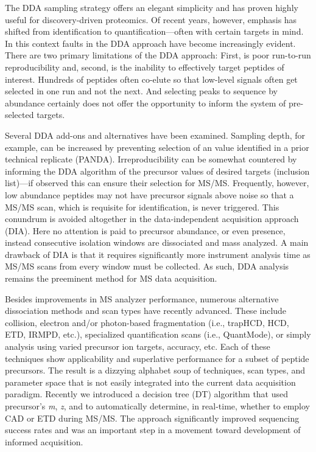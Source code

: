 The DDA sampling strategy offers an elegant simplicity and has proven highly useful for discovery-driven proteomics. Of recent years, however, emphasis has shifted from identification to quantification---often with certain targets in mind. In this context faults in the DDA approach have become increasingly evident. There are two primary limitations of the DDA approach: First, is poor run-to-run reproducibility and, second, is the inability to effectively target peptides of interest.\cite{randomsampling} Hundreds of peptides often co-elute so that low-level signals often get selected in one run and not the next. And selecting \mz{} peaks to sequence by abundance certainly does not offer the opportunity to inform the system of pre-selected targets.

Several DDA add-ons and alternatives have been examined. Sampling depth, for example, can be increased by preventing selection of an \mz{} value identified in a prior technical replicate (PANDA).\cite{panda} Irreproducibility can be somewhat countered by informing the DDA algorithm of the precursor \mz{} values of desired targets (inclusion list)---if observed this can ensure their selection for MS/MS. Frequently, however, low abundance peptides may not have precursor signals above noise so that a MS/MS scan, which is requisite for identification, is never triggered. This conundrum is avoided altogether in the data-independent acquisition approach (DIA).\cite{dia} Here no attention is paid to precursor abundance, or even presence, instead consecutive \mz{} isolation windows are dissociated and mass analyzed. A main drawback of DIA is that it requires significantly more instrument analysis time as MS/MS scans from every \mz{} window must be collected.\cite{ocean} As such, DDA analysis remains the preeminent method for MS data acquisition.

Besides improvements in MS analyzer performance, numerous alternative dissociation methods and scan types have recently advanced. These include collision, electron and/or photon-based fragmentation (i.e., trapHCD, HCD, ETD, IRMPD, etc.), specialized quantification scans (i.e., QuantMode), or simply analysis using varied precursor ion targets, \mz{} accuracy, etc.\cite{traphcd,hcd,etd,irmpd,quantmode,twostage} Each of these techniques show applicability and superlative performance for a subset of peptide precursors. The result is a dizzying alphabet soup of techniques, scan types, and parameter space that is not easily integrated into the current data acquisition paradigm. Recently we introduced a decision tree (DT) algorithm that used precursor's \textit{m}, \textit{z}, and \mz{} to automatically determine, in real-time, whether to employ CAD or ETD during MS/MS.\cite{dtree} The approach significantly improved sequencing success rates and was an important step in a movement toward development of informed acquisition.

